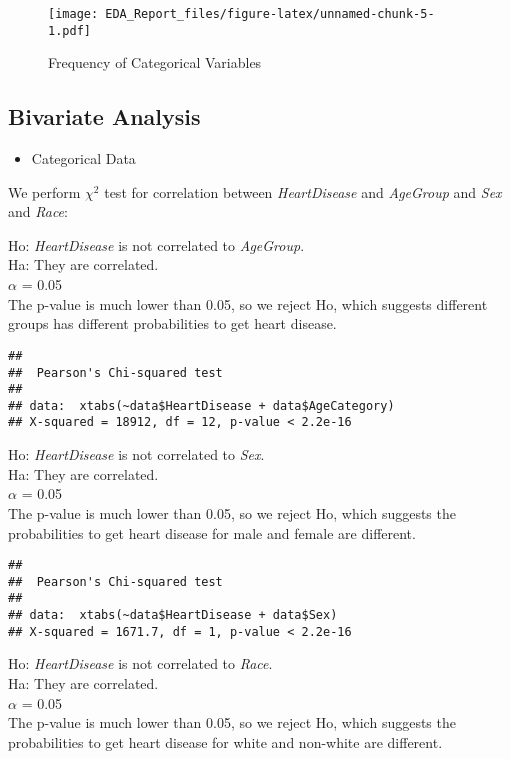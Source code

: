 \documentclass[
  11pt,
]{article}
\providecommand{\tightlist}{%
  \setlength{\itemsep}{0pt}\setlength{\parskip}{0pt}}
\begin{document}
\begin{figure}
\centering
\texttt{[image: EDA\_Report\_files/figure-latex/unnamed-chunk-5-1.pdf]}
\caption{Frequency of Categorical Variables}
\end{figure}

\hypertarget{bivariate-analysis}{%
\subsection{Bivariate Analysis}\label{bivariate-analysis}}

\begin{itemize}
\tightlist
\item
  Categorical Data
\end{itemize}

We perform \(\chi^2\) test for correlation between \emph{HeartDisease}
and \emph{AgeGroup} and \emph{Sex} and \emph{Race}:

Ho: \emph{HeartDisease} is not correlated to \emph{AgeGroup}.\\
Ha: They are correlated.\\
\(\alpha\) = 0.05\\
The p-value is much lower than 0.05, so we reject Ho, which suggests
different groups has different probabilities to get heart disease.

\begin{verbatim}
## 
##  Pearson's Chi-squared test
## 
## data:  xtabs(~data$HeartDisease + data$AgeCategory)
## X-squared = 18912, df = 12, p-value < 2.2e-16
\end{verbatim}

Ho: \emph{HeartDisease} is not correlated to \emph{Sex}.\\
Ha: They are correlated.\\
\(\alpha\) = 0.05\\
The p-value is much lower than 0.05, so we reject Ho, which suggests the
probabilities to get heart disease for male and female are different.

\begin{verbatim}
## 
##  Pearson's Chi-squared test
## 
## data:  xtabs(~data$HeartDisease + data$Sex)
## X-squared = 1671.7, df = 1, p-value < 2.2e-16
\end{verbatim}

Ho: \emph{HeartDisease} is not correlated to \emph{Race}.\\
Ha: They are correlated.\\
\(\alpha\) = 0.05\\
The p-value is much lower than 0.05, so we reject Ho, which suggests the
probabilities to get heart disease for white and non-white are
different.
\end{document}
